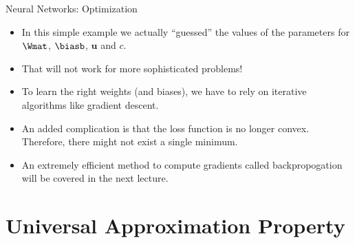\begin{frame} {Neural Networks: Optimization}
  \begin{itemize}
    \item In this simple example we actually \enquote{guessed} the values of the parameters for $\Wmat$, $\biasb$, $\bm{u}$ and $c$.
    \vspace{3mm}
    \item That will not work for more sophisticated problems!
    \vspace{3mm}
    \item To learn the right weights (and biases), we have to rely on iterative algorithms like gradient descent.
    \vspace{3mm}
    \item An added complication is that the loss function is no longer convex. Therefore, there might not exist a single minimum. 
    \vspace{3mm}
    \item An extremely efficient method to compute gradients called backpropogation will be covered in the next lecture.
  \end{itemize}
\end{frame}

\section{Universal Approximation Property}

